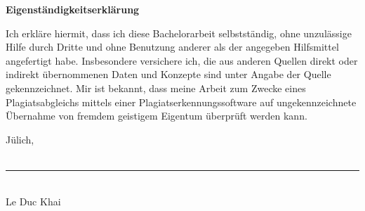 \clearpage

\mbox{}

\textbf{Eigenständigkeitserklärung}

\noindent Ich erkläre hiermit, dass ich diese Bachelorarbeit selbstständig, ohne unzulässige Hilfe durch Dritte und ohne Benutzung anderer als der angegeben Hilfsmittel angefertigt habe. 
Insbesondere versichere ich, die aus anderen Quellen direkt oder indirekt übernommenen Daten und Konzepte sind unter Angabe der Quelle gekennzeichnet. 
Mir ist bekannt, dass meine Arbeit zum Zwecke eines Plagiatsabgleichs mittels einer Plagiatserkennungssoftware auf ungekennzeichnete Übernahme von fremdem geistigem Eigentum überprüft werden kann.

\vspace{1cm}
Jülich, \\
\vspace{1.0cm} \\
\rule{40mm}{0.2mm}\\
Le Duc Khai
